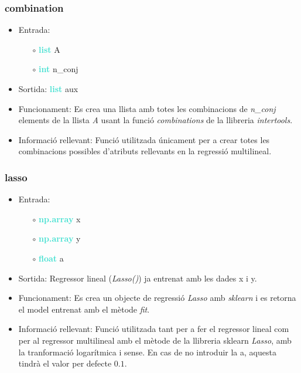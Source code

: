 \documentclass[a4paper, 11pt]{article}
\begin{document}
\subsubsection{combination}
\begin{itemize}
    \item Entrada:
    \begin{itemize}
        \item [$\circ$]  \textbf{\textcolor{Turquoise}{list}} A
        \item [$\circ$] \textbf{\textcolor{Turquoise}{int}} n\_conj
    \end{itemize}
    \item Sortida:  \textbf{\textcolor{Turquoise}{list}} aux
    \item Funcionament: Es crea una llista amb totes les combinacions de \textit{n\_conj} elements de la llista \textit{A} usant la funció \textit{combinations} de la llibreria \textit{intertools}.
    \item Informació rellevant: Funció utilitzada únicament per a crear totes les combinacions possibles d'atributs rellevants en la regressió multilineal. \label{combination}
\end{itemize}


\subsubsection{lasso}
\begin{itemize}
    \item Entrada:
    \begin{itemize}
        \item [$\circ$] \textbf{\textcolor{Turquoise}{np.array}} x
        \item [$\circ$] \textbf{\textcolor{Turquoise}{np.array}} y
        \item [$\circ$] \textbf{\textcolor{Turquoise}{float}} a

    \end{itemize}
    \item Sortida: Regressor lineal (\textit{Lasso()}) ja entrenat amb les dades x i y.
    \item Funcionament: Es crea un objecte de regressió \textit{Lasso} amb \textit{sklearn} i es retorna el model entrenat amb el mètode \textit{fit}.
    \item Informació rellevant: Funció utilitzada tant per a fer el regressor lineal com per al regressor multilineal amb el mètode de la llibreria sklearn \textit{Lasso}, amb la tranformació logarítmica i sense. En cas de no introduir la a, aquesta tindrà el valor per defecte $0.1$.\label{lasso}
\end{itemize}
\end{document}
